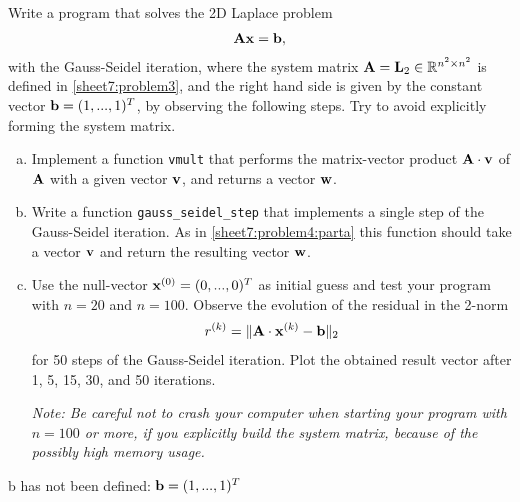 \begin{Sheet}
  \begin{Problem}[Programming]
    Write a program that solves the 2D Laplace problem
    \begin{gather*}
      \mathbf A\mathbf x=\mathbf b,
    \end{gather*}
    with the Gauss-Seidel iteration, where the system matrix
    $\mathbf A=\mathbf L_2\in\mathbb R^{n^2\times n^2}$ is defined in
    \cref{sheet7:problem3}, and the right hand side is given by the
    constant vector $\mathbf b=(1,...,1)^T$, by observing the following
    steps. Try to avoid explicitly forming the system matrix.
    \begin{enumerate}[(a)]
    \item\label{sheet7:problem4:parta} Implement a function
      \lstinline{vmult} that performs the matrix-vector product
      $\mathbf A\cdot\mathbf v$ of $\mathbf A$ with a given vector $\mathbf v$, and
      returns a vector $\mathbf w$.
    \item Write a function \lstinline{gauss_seidel_step} that
      implements a single step of the Gauss-Seidel iteration. As in
      \eqref{sheet7:problem4:parta} this function should take a vector
      $\mathbf v$ and return the resulting vector $\mathbf w$.
    \item Use the null-vector $\mathbf x^{(0)} = (0,...,0)^T$ as initial
      guess and test your program with $n=20$ and $n=100$. Observe the
      evolution of the residual in the 2-norm
      \begin{gather*}
        r^{(k)} = \lVert\mathbf A\cdot\mathbf x^{(k)}-\mathbf b\rVert_2
      \end{gather*}
      for 50 steps of the Gauss-Seidel iteration.  Plot the obtained
      result vector after 1, 5, 15, 30, and 50 iterations.

      \textit{Note: Be careful not to crash your computer when
        starting your program with $n=100$ or more, if you explicitly
        build the system matrix, because of the possibly high memory
        usage.}
    \end{enumerate}

    \begin{todo}
      b has not been defined: $\mathbf b=(1,...,1)^T$
    \end{todo}
  \end{Problem}

\end{Sheet}


